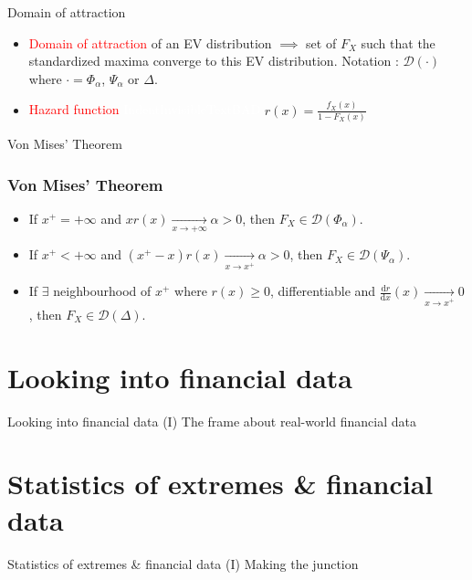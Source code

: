\documentclass{beamer}
\begin{document}
\begin{frame}{Domain of attraction}
	\begin{itemize}
		\item \textcolor{red}{Domain of attraction} of an EV distribution $\implies$ set of $F_X$ such that the standardized maxima converge to this EV distribution. \newline
		Notation : $\mathcal{D}(\cdot)$ where $\cdot = \Phi_\alpha$, $\Psi_\alpha$ or $\Delta$.
		\newline
		\item \textcolor{red}{Hazard function} \newline
		 \textcolor{white}{IndentInvisibleTextBAD} $r(x) = \frac{f_X(x)}{1 - F_X(x)}$
	\end{itemize}
\end{frame}

\begin{frame}{Von Mises' Theorem}
	\frametitle{Von Mises' Theorem}
	\begin{theorem}
		\begin{itemize}
		\item If $x^+ = + \infty$ and $x r(x) \xrightarrow[x \rightarrow + \infty]{} \alpha > 0$, then $F_X \in \mathcal{D}(\Phi_\alpha)$.
		\item If $x^+ < + \infty$ and $(x^+ - x) r(x) \xrightarrow[x \rightarrow x^+]{} \alpha > 0$, then $F_X \in \mathcal{D}(\Psi_\alpha)$.
		\item If $\exists$ neighbourhood of $x^+$ where $r(x) \ge 0$, differentiable and $\frac{\mathrm{d}r}{\mathrm{d}x}(x) \xrightarrow[x \rightarrow x^+]{} 0$, then $F_X \in \mathcal{D}(\Delta)$.
		\end{itemize}
	\end{theorem}
\end{frame}

\section{Looking into financial data}
\begin{frame}{Looking into financial data (I)}
	The frame about real-world financial data
\end{frame}

\section{Statistics of extremes \& financial data}
\begin{frame}{Statistics of extremes \& financial data (I)}
	Making the junction
\end{frame}
\end{document}
